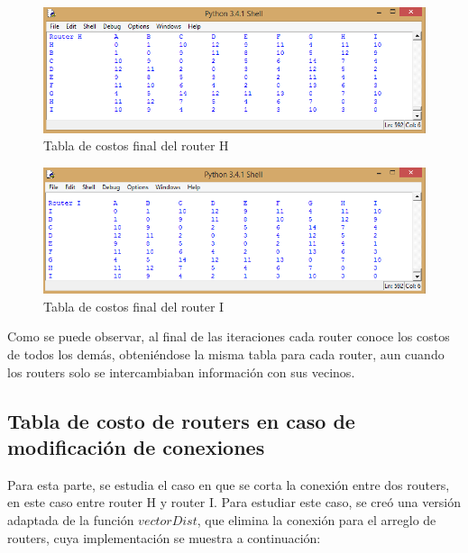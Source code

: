 \documentclass{article}
\begin{document}
\begin{figure}[H]
\centering
\includegraphics[width=\textwidth]{p28.png}
\caption{Tabla de costos final del router H}
\label{fig:Tabla de costos}
\end{figure}

\begin{figure}[H]
\centering
\includegraphics[width=\textwidth]{p29.png}
\caption{Tabla de costos final del router I}
\label{fig:Tabla de costos}
\end{figure}

Como se puede observar, al final de las iteraciones cada router conoce los costos de todos los demás, obteniéndose la misma tabla para cada router, aun cuando los routers solo se intercambiaban información con sus vecinos.

\subsection{Tabla de costo de routers en caso de modificación de conexiones}
Para esta parte, se estudia el caso en que se corta la conexión entre dos routers, en este caso entre router H y router I. Para estudiar este caso, se creó una versión adaptada de la función $vectorDist$, que elimina la conexión para el arreglo de routers, cuya implementación se muestra a continuación:
\end{document}
